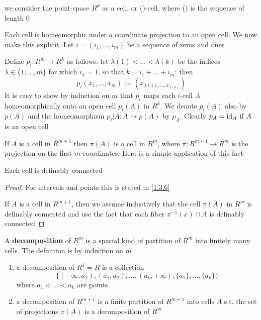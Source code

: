 \documentclass[11pt]{article}
\begin{document}
we consider the point-space \(R^0\) as a cell, or ()-cell, where () is the sequence of length 0

Each cell is homeomorphic under a coordinate projection to an open cell. We now make this
explicit. Let \(i=(i_1,\dots,i_m)\) be a sequence of zeros and ones

Define \(p_i:R^m\to R^k\) as follows: let \(\lambda(1)<\dots<\lambda(k)\) be the indices \(\lambda\in\{1,\dots,m\}\) for
which \(i_\lambda=1\), so that \(k=i_1+\dots+i_m\); then
\begin{equation*}
p_i(x_1,\dots,x_m):=(x_{\lambda(1),\dots,x_{\lambda(k)}})
\end{equation*}
It is easy to show by induction on \(m\) that \(p_i\) maps each \(i\)-cell \(A\) homeomorphically
onto an open cell \(p_i(A)\) in \(R^k\). We denote \(p_i(A)\) also by \(p(A)\) and the
homeomorphism \(p_i|A:A\to p(A)\) by \(p_A\). Clearly \(p_A=\operatorname{id}_A\) if \(A\) is an open cell

If \(A\) is a cell in \(R^{m+1}\) then \(\pi(A)\) is a cell in \(R^m\), where \(\pi:R^{m+1}\to R^m\) is
the projection on the first \(m\) coordinates. Here is a simple application of this fact

\begin{proposition}[]
Each cell is definably connected
\end{proposition}

\begin{proof}
For intervals and points this is stated in \ref{1.3.6}

If \(A\) is a cell in \(R^{m+1}\), then we assume inductively that the cell \(\pi(A)\) in \(R^m\)
is definably connected and use the fact that each fiber \(\pi^{-1}(x)\cap A\) is definably connected
\end{proof}

\begin{definition}[]
A \textbf{decomposition} of \(R^m\) is a special kind of partition of \(R^m\) into finitely many cells. The
definition is by induction on \(m\)
\begin{enumerate}
\item a decomposition of \(R^1=R\) is a collection
\begin{equation*}
\{(-\infty,a_1),(a_1,a_2),\dots,(a_k,+\infty),\{a_1\},\dots,\{a_k\}\}
\end{equation*}
where \(a_1<\dots<a_k\) are points
\item a decomposition of \(R^{m+1}\) is a finite partition of \(R^{m+1}\) into cells \(A\) s.t. the
set of projections \(\pi(A)\) is a decomposition of \(R^m\)
\end{enumerate}
\end{definition}
\end{document}

